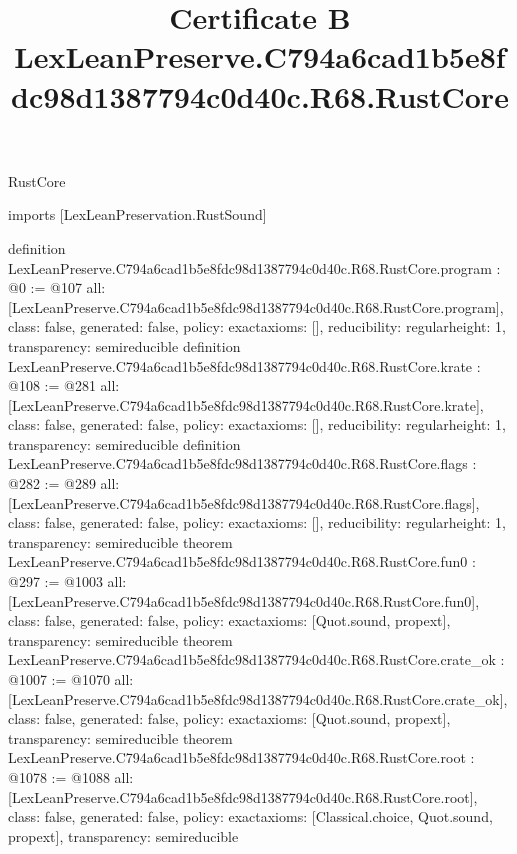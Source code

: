 \begin{lexlean}{RustCore}
\title{Certificate B LexLeanPreserve.C794a6cad1b5e8fdc98d1387794c0d40c.R68.RustCore}
\begin{coremodule}
imports [LexLeanPreservation.RustSound]

definition LexLeanPreserve.C794a6cad1b5e8fdc98d1387794c0d40c.R68.RustCore.program : @0 := @107 {
  all: [LexLeanPreserve.C794a6cad1b5e8fdc98d1387794c0d40c.R68.RustCore.program],
  class: false,
  generated: false,
  policy: exact{axioms: []},
  reducibility: regular{height: 1},
  transparency: semireducible
}
definition LexLeanPreserve.C794a6cad1b5e8fdc98d1387794c0d40c.R68.RustCore.krate : @108 := @281 {
  all: [LexLeanPreserve.C794a6cad1b5e8fdc98d1387794c0d40c.R68.RustCore.krate],
  class: false,
  generated: false,
  policy: exact{axioms: []},
  reducibility: regular{height: 1},
  transparency: semireducible
}
definition LexLeanPreserve.C794a6cad1b5e8fdc98d1387794c0d40c.R68.RustCore.flags : @282 := @289 {
  all: [LexLeanPreserve.C794a6cad1b5e8fdc98d1387794c0d40c.R68.RustCore.flags],
  class: false,
  generated: false,
  policy: exact{axioms: []},
  reducibility: regular{height: 1},
  transparency: semireducible
}
theorem LexLeanPreserve.C794a6cad1b5e8fdc98d1387794c0d40c.R68.RustCore.fun0 : @297 := @1003 {
  all: [LexLeanPreserve.C794a6cad1b5e8fdc98d1387794c0d40c.R68.RustCore.fun0],
  class: false,
  generated: false,
  policy: exact{axioms: [Quot.sound, propext]},
  transparency: semireducible
}
theorem LexLeanPreserve.C794a6cad1b5e8fdc98d1387794c0d40c.R68.RustCore.crate_ok : @1007 := @1070 {
  all: [LexLeanPreserve.C794a6cad1b5e8fdc98d1387794c0d40c.R68.RustCore.crate_ok],
  class: false,
  generated: false,
  policy: exact{axioms: [Quot.sound, propext]},
  transparency: semireducible
}
theorem LexLeanPreserve.C794a6cad1b5e8fdc98d1387794c0d40c.R68.RustCore.root : @1078 := @1088 {
  all: [LexLeanPreserve.C794a6cad1b5e8fdc98d1387794c0d40c.R68.RustCore.root],
  class: false,
  generated: false,
  policy: exact{axioms: [Classical.choice, Quot.sound, propext]},
  transparency: semireducible
}


\end{coremodule}
\end{lexlean}
